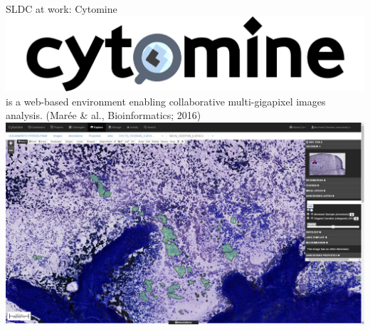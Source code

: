 \documentclass{beamer}
\begin{document}
\begin{frame}{SLDC at work: Cytomine}
	\includegraphics[scale=0.09]{images/cytomine_typo.png} is a web-based environment enabling collaborative multi-gigapixel images analysis. {\footnotesize(Marée \& al., Bioinformatics; 2016)}\\
	\vspace*{0.01in}
	\hspace*{-1.5in}\includegraphics[scale=0.24]{images/cytomine.png}
\end{frame}
\end{document}
